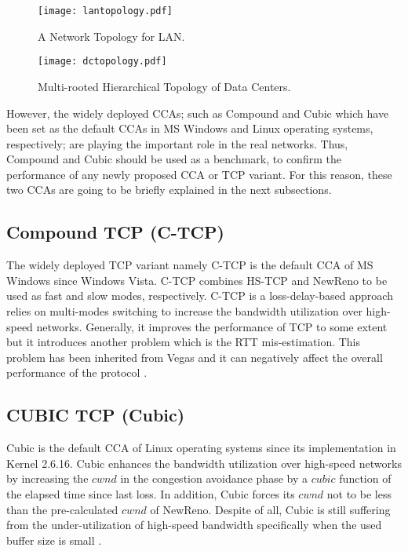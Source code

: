 \documentclass[preprint,3p,times,twocolumn,authoryear]{elsarticle}
\begin{document}
\begin{figure} [t]
\centering
\texttt{[image: lantopology.pdf]}
\caption{A Network Topology for LAN.}
\label{fig:lantopology}
\end{figure}

\begin{figure}[t]
\centering
\texttt{[image: dctopology.pdf]}
\caption{Multi-rooted Hierarchical Topology of Data Centers.}
\label{fig:dctopology}
\end{figure}

However, the widely deployed CCAs; such as Compound and Cubic which have been set as the default CCAs in MS Windows and Linux operating systems, respectively; are playing the important role in the real networks. Thus, Compound and Cubic should be used as a benchmark, to confirm the performance of any newly proposed CCA or TCP variant. For this reason, these two CCAs are going to be briefly explained in the next subsections.

\subsection{Compound TCP (C-TCP)}
The widely deployed TCP variant namely C-TCP \citep{Tan2006} is the default CCA of MS Windows since Windows Vista. C-TCP combines HS-TCP \citep{Floyd2003} and NewReno \citep{floyd1999} to be used as fast and slow modes, respectively. C-TCP is a loss-delay-based approach relies on multi-modes switching to increase the bandwidth utilization over high-speed networks. Generally, it improves the performance of TCP to some extent but it introduces another problem which is the RTT mis-estimation. This problem has been inherited from Vegas \citep{brak1995} and it can negatively affect the overall performance of the protocol \citep{Afanasyev2010, alrshah2014}.

\subsection{CUBIC TCP (Cubic)}
Cubic \citep{Ha2008} is the default CCA of Linux operating systems since its implementation in Kernel 2.6.16. Cubic enhances the bandwidth utilization over high-speed networks by increasing the $cwnd$ in the congestion avoidance phase by a $cubic$ function of the elapsed time since last loss. In addition, Cubic forces its $cwnd$ not to be less than the pre-calculated $cwnd$ of NewReno. Despite of all, Cubic is still suffering from the under-utilization of high-speed bandwidth specifically when the used buffer size is small \citep{Afanasyev2010, alrshah2014, Ha2008}.
\end{document}
